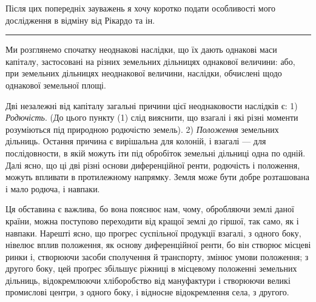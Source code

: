 Після цих попередніх зауважень я хочу коротко подати особливості мого
дослідження в відміну від Рікардо та ін.

\pfbreak

Ми розглянемо спочатку неоднакові наслідки, що їх дають однакові маси
капіталу, застосовані на різних земельних дільницях однакової величини: або,
при земельних дільницях неоднакової величини, наслідки, обчислені щодо однакової
земельної площі.

Дві незалежні від капіталу загальні причини цієї неоднаковости наслідків
є: 1) \emph{Родючість}. (До цього пункту (1) слід вияснити, що взагалі і які
різні моменти розуміються під природною родючістю земель). 2) \emph{Положення}
земельних дільниць. Остання причина є вирішальна для колоній, і взагалі — для
послідовности, в якій можуть іти під обробіток земельні дільниці одна по одній.
Далі ясно, що ці дві різні основи диференційної ренти, родючість і положення,
можуть впливати в протилежному напрямку. Земля може бути добре розташована
і мало родюча, і навпаки.

Ця обставина є важлива, бо вона пояснює нам, чому, обробляючи землі
даної країни, можна поступово переходити від кращої землі до гіршої, так само,
як і навпаки. Нарешті ясно, що прогрес суспільної продукції взагалі, з одного
боку, нівелює вплив положення, як основу диференційної ренти, бо він створює
місцеві ринки і, створюючи засоби сполучення й транспорту, змінює умови
положення; з другого боку, цей проґрес збільшує ріжниці в місцевому положенні
земельних дільниць, відокремлюючи хліборобство від мануфактури і створюючи
великі промислові центри, з одного боку, і відносне відокремлення села, з другого.

